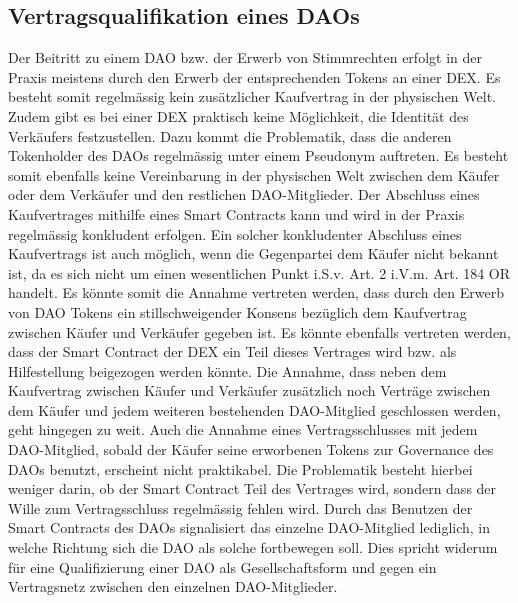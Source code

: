 \documentclass[a4paper,12pt]{report}
\begin{document}
    \subsection{Vertragsqualifikation eines DAOs}
	\startsubsection
    Der Beitritt zu einem DAO bzw. der Erwerb von Stimmrechten erfolgt in der Praxis meistens durch den Erwerb der entsprechenden Tokens an einer DEX. Es besteht somit regelmässig kein zusätzlicher Kaufvertrag in der physischen Welt. Zudem gibt es bei einer DEX praktisch keine Möglichkeit, die Identität des Verkäufers festzustellen. Dazu kommt die Problematik, dass die anderen Tokenholder des DAOs regelmässig unter einem Pseudonym auftreten. Es besteht somit ebenfalls keine Vereinbarung in der physischen Welt zwischen dem Käufer oder dem Verkäufer und den restlichen DAO-Mitglieder.  
    Der Abschluss eines Kaufvertrages mithilfe eines Smart Contracts kann und wird in der Praxis regelmässig konkludent erfolgen. Ein solcher konkludenter Abschluss eines Kaufvertrags ist auch möglich, wenn die Gegenpartei dem Käufer nicht bekannt ist, da es sich nicht um einen wesentlichen Punkt i.S.v. Art. 2 i.V.m. Art. 184 OR handelt. Es könnte somit die Annahme vertreten werden, dass durch den Erwerb von DAO Tokens ein stillschweigender Konsens bezüglich dem Kaufvertrag zwischen Käufer und Verkäufer gegeben ist. Es könnte ebenfalls vertreten werden, dass der Smart Contract der DEX ein Teil dieses Vertrages wird bzw. als Hilfestellung beigezogen werden könnte. Die Annahme, dass neben dem Kaufvertrag zwischen Käufer und Verkäufer zusätzlich noch Verträge zwischen dem Käufer und jedem weiteren bestehenden DAO-Mitglied geschlossen werden, geht hingegen zu weit. Auch die Annahme eines Vertragsschlusses mit jedem DAO-Mitglied, sobald der Käufer seine erworbenen Tokens zur Governance des DAOs benutzt, erscheint nicht praktikabel. Die Problematik besteht hierbei weniger darin, ob der Smart Contract Teil des Vertrages wird, sondern dass der Wille zum Vertragsschluss regelmässig fehlen wird. Durch das Benutzen der Smart Contracts des DAOs signalisiert das einzelne DAO-Mitglied lediglich, in welche Richtung sich die DAO als solche fortbewegen soll.
    Dies spricht widerum für eine Qualifizierung einer DAO als Gesellschaftsform und gegen ein Vertragsnetz zwischen den einzelnen DAO-Mitglieder.
    \closesection
    \closesection
    
\end{document}
